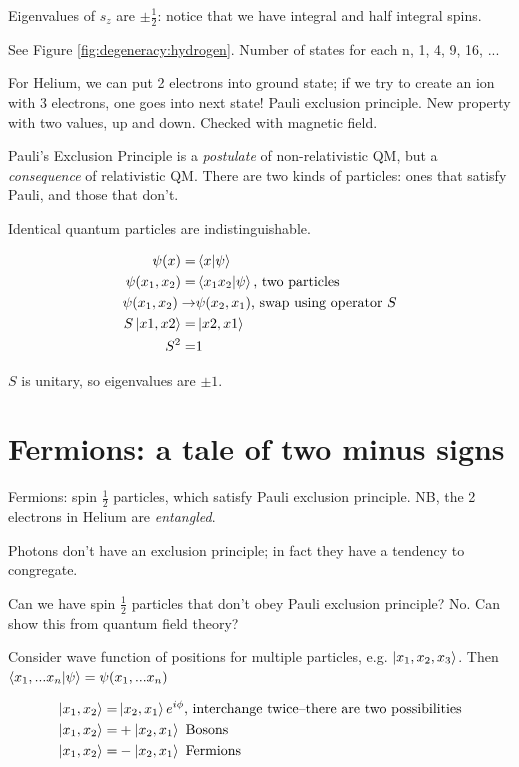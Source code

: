 \documentclass[]{article}
\begin{document}
Eigenvalues of $s_z$ are $\pm \frac{1}{2}$: notice that we have integral and half integral spins.


See Figure \ref{fig:degeneracy:hydrogen}. Number of states for each n, 1, 4, 9, 16, ...

For Helium, we can put 2 electrons into ground state; if we try to create an ion with 3 electrons, one goes into next state! Pauli exclusion principle. New property with two values, up and down. Checked with magnetic field.

Pauli's Exclusion Principle is a\emph{ postulate} of non-relativistic QM, but a \emph{consequence} of relativistic QM. There are two kinds of particles: ones that satisfy Pauli, and those that don't.

Identical quantum particles are indistinguishable.

\begin{align*}
\psi(x) =& \braket{x|\psi}\\
\psi(x_1,x_2) =& \braket{x_1x_2|\psi}\text{, two particles}\\
\psi(x_1,x_2) \rightarrow & \psi(x_2,x_1)\text{, swap using operator $S$}\\
S\ket{x1,x2} =& \ket{x2,x1}\\
S^2 =& 1
\end{align*}

$S$ is unitary, so eigenvalues are $\pm1$.

\section{Fermions: a tale of two minus signs}

Fermions: spin $\frac{1}{2}$ particles, which satisfy Pauli exclusion principle. NB, the 2 electrons in Helium are \textit{entangled}.

Photons don't have an exclusion principle; in fact they have a tendency to congregate.
 
Can we have spin $\frac{1}{2}$ particles that don't obey Pauli exclusion principle? No. Can show this from quantum field theory?

Consider wave function of positions for multiple particles, e.g. $\ket{x_1,x_2,x_3}$. Then $\braket{x_1,...x_n|\psi}=\psi(x_1,...x_n)$

\begin{align*}
\ket{x_1, x_2}=&\ket{x_2, x_1}e^{i\phi}\text{, interchange twice--there are two possibilities}\\
\ket{x_1, x_2}=&+\ket{x_2, x_1}\text{ Bosons}\\
\ket{x_1, x_2}=&-\ket{x_2, x_1}\text{ Fermions}
\end{align*}
\end{document}

